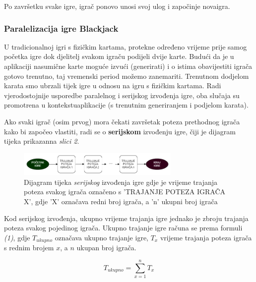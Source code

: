 \documentclass[conference]{IEEEtran}
\begin{document}
Po završetku svake igre, igrač ponovo unosi svoj ulog i započinje nova\break igra. 


\subsubsection{Paralelizacija igre Blackjack}

U tradicionalnoj igri s fizičkim kartama, protekne određeno vrijeme prije samog početka igre dok djelitelj svakom igraču podijeli dvije karte. Budući da je u aplikaciji nasumične karte moguće izvući (generirati) i o istima obavijestiti igrača gotovo trenutno, taj vremenski period možemo zanemariti. Trenutnom dodjelom karata smo ubrzali tijek igre u odnosu na igru s fizičkim kartama. Radi vjerodostojnije usporedbe paralelnog i serijskog izvođenja igre, oba slučaja su promotrena u kontekstu\break aplikacije (s trenutnim generiranjem i podjelom karata).

Ako svaki igrač (osim prvog) mora čekati završetak poteza prethodnog igrača kako bi započeo vlastiti, radi se o \textbf{serijskom} izvođenju igre, čiji je dijagram tijeka prikazan\break na \textit{slici 2}. 

\begin{figure}[H]
\centerline{\includegraphics[width=18.5pc]{serijsko-bijelo.png}}
\caption{Dijagram tijeka \textit{serijskog} izvođenja igre gdje je vrijeme trajanja poteza svakog igrača označeno s 'TRAJANJE POTEZA IGRAČA X', gdje 'X' označava redni broj igrača, a 'n' ukupni broj igrača}
\vspace*{-5pt}
\end{figure}

Kod serijskog izvođenja, ukupno vrijeme trajanja igre jednako je zbroju trajanja poteza svakog pojedinog igrača. Ukupno trajanje igre računa se prema formuli \textit{(1)}, gdje $T_{ukupno}$ označava ukupno trajanje igre, $T_x$ vrijeme trajanja poteza igrača s rednim brojem $x$, a $n$ ukupan broj igrača.

\begin{equation}
T_{ukupno} = \sum_{x=1}^{n} T_x
\end{equation}
\end{document}
